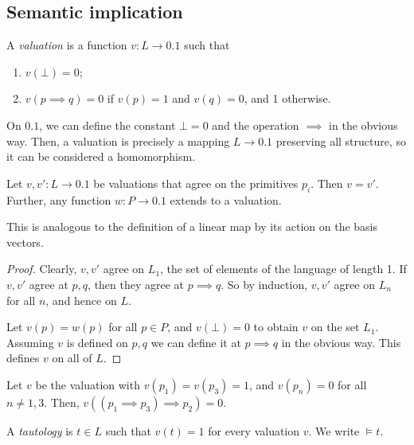 \subsection{Semantic implication}
\begin{definition}
    A \emph{valuation} is a function \( v \colon L \to \qty{0,1} \) such that
    \begin{enumerate}
        \item \( v(\bot) = 0 \);
        \item \( v(p \implies q) = 0 \) if \( v(p) = 1 \) and \( v(q) = 0 \), and 1 otherwise.
    \end{enumerate}
\end{definition}
\begin{remark}
    On \( \qty{0,1} \), we can define the constant \( \bot = 0 \) and the operation \( \implies \) in the obvious way.
    Then, a valuation is precisely a mapping \( L \to \qty{0,1} \) preserving all structure, so it can be considered a homomorphism.
\end{remark}
\begin{proposition}
    Let \( v, v' \colon L \to \qty{0,1} \) be valuations that agree on the primitives \( p_i \).
    Then \( v = v' \).
    Further, any function \( w \colon P \to \qty{0,1} \) extends to a valuation.
\end{proposition}
\begin{remark}
    This is analogous to the definition of a linear map by its action on the basis vectors.
\end{remark}
\begin{proof}
    Clearly, \( v, v' \) agree on \( L_1 \), the set of elements of the language of length 1.
    If \( v, v' \) agree at \( p, q \), then they agree at \( p \implies q \).
    So by induction, \( v, v' \) agree on \( L_n \) for all \( n \), and hence on \( L \).

    Let \( v(p) = w(p) \) for all \( p \in P \), and \( v(\bot) = 0 \) to obtain \( v \) on the set \( L_1 \).
    Assuming \( v \) is defined on \( p, q \) we can define it at \( p \implies q \) in the obvious way.
    This defines \( v \) on all of \( L \).
\end{proof}
\begin{example}
    Let \( v \) be the valuation with \( v(p_1) = v(p_3) = 1 \), and \( v(p_n) = 0 \) for all \( n \neq 1, 3 \).
    Then, \( v((p_1 \implies p_3) \implies p_2) = 0 \).
\end{example}
\begin{definition}
    A \emph{tautology} is \( t \in L \) such that \( v(t) = 1 \) for every valuation \( v \).
    We write \( \models t \).
\end{definition}
